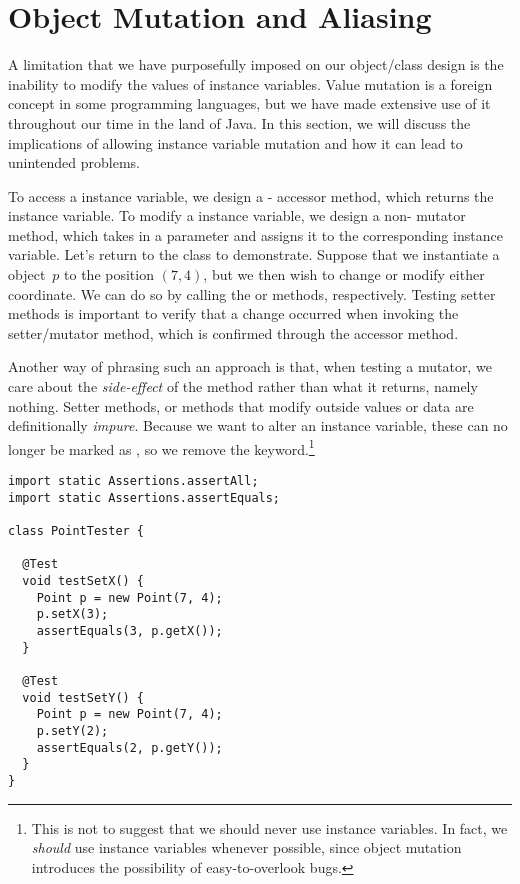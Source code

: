 \section{Object Mutation and Aliasing}
\label{sec:object-mutation-and-aliasing}
A limitation that we have purposefully imposed on our object/class design is the inability to modify the values of instance variables. Value mutation is a foreign concept in some programming languages, but we have made extensive use of it throughout our time in the land of Java. In this section, we will discuss the implications of allowing instance variable mutation and how it can lead to unintended problems.

To access a  instance variable, we design a \non- accessor method, which returns the instance variable. To modify a  instance variable, we design a non- mutator method, which takes in a parameter and assigns it to the corresponding instance variable. Let's return to the  class to demonstrate. Suppose that we instantiate a  object~$p$ to the position $(7, 4)$, but we then wish to change or modify either coordinate. We can do so by calling the  or  methods, respectively. Testing setter methods is important to verify that a change occurred when invoking the setter/mutator method, which is confirmed through the accessor method. 

Another way of phrasing such an approach is that, when testing a mutator, we care about the \emph{side-effect} of the method rather than what it returns, namely nothing. Setter methods, or methods that modify outside values or data are definitionally \emph{impure}. Because we want to alter an instance variable, these can no longer be marked as , so we remove the keyword.\footnote{This is not to suggest that we should never use  instance variables. In fact, we \emph{should} use  instance variables whenever possible, since object mutation introduces the possibility of easy-to-overlook bugs.}

\begin{lstlisting}[language=MyJava]
import static Assertions.assertAll;
import static Assertions.assertEquals;

class PointTester {

  @Test
  void testSetX() {
    Point p = new Point(7, 4);
    p.setX(3);
    assertEquals(3, p.getX());
  }

  @Test
  void testSetY() {
    Point p = new Point(7, 4);
    p.setY(2);
    assertEquals(2, p.getY());
  }
}
\end{lstlisting}


